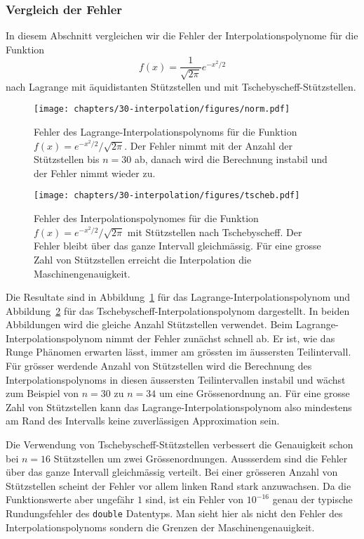%
%
%
\subsubsection{Vergleich der Fehler}
In diesem Abschnitt vergleichen wir die Fehler der Interpolationspolynome
für die Funktion
%
%
\[
f(x)
=
\frac{1}{\sqrt{2\pi}} e^{-x^2/2}
\]
nach Lagrange mit äquidistanten Stützstellen und mit
%
%
Tschebyscheff-Stützstellen.
%

\begin{figure}
\centering
\texttt{[image: chapters/30-interpolation/figures/norm.pdf]}
\caption{Fehler des Lagrange-Interpolationspolynoms für die Funktion
$f(x)=e^{-x^2/2}/\sqrt{2\pi}$.
Der Fehler nimmt mit der Anzahl der Stützstellen bis $n=30$ ab, danach
wird die Berechnung instabil und der Fehler nimmt wieder zu.
%
\label{buch:figure:lagrangefehler}}
\end{figure}


\begin{figure}
\centering
\texttt{[image: chapters/30-interpolation/figures/tscheb.pdf]}
\caption{Fehler des Interpolationspolynomes für die Funktion
$f(x)=e^{-x^2/2}/\sqrt{2\pi}$ mit Stützstellen nach Tschebyscheff.
Der Fehler bleibt über das ganze Intervall gleichmässig.
Für eine grosse Zahl von Stützstellen erreicht die Interpolation die
Maschinengenauigkeit.
\label{buch:figure:tschebyschefffehler}}
\end{figure}

Die Resultate sind in Abbildung~\ref{buch:figure:lagrangefehler}
für das Lagrange-Interpolationspolynom und
Abbildung~\ref{buch:figure:tschebyschefffehler}
für das Tschebyscheff-Interpolationspolynom dargestellt.
In beiden Abbildungen wird die gleiche Anzahl Stützstellen verwendet.
Beim Lagrange-Interpolationspolynom nimmt der Fehler zunächst schnell ab.
Er ist, wie das Runge Phänomen erwarten lässt, immer am grössten im
äussersten Teilintervall.
Für grösser werdende Anzahl von Stützstellen wird die Berechnung des 
Interpolationspolynoms in diesen äussersten Teilintervallen instabil
und wächst zum Beispiel von $n=30$ zu $n=34$ um eine Grössenordnung an.
Für eine grosse Zahl von Stützstellen kann das Lagrange-Interpolationspolynom
also mindestens am Rand des Intervalls keine zuverlässigen Approximation sein.

Die Verwendung von Tschebyscheff-Stützstellen verbessert die Genauigkeit
schon bei $n=16$ Stützstellen um zwei Grössenordnungen.
Aussserdem sind die Fehler über das ganze Intervall gleichmässig
verteilt.
Bei einer grösseren Anzahl von Stützstellen scheint der Fehler 
vor allem linken Rand stark anzuwachsen.
Da die Funktionswerte aber ungefähr $1$ sind, ist
ein Fehler von $10^{-16}$ genau der typische Rundungsfehler des
\texttt{double} Datentyps.
Man sieht hier als nicht den Fehler des Interpolationspolynoms sondern
die Grenzen der Maschinengenauigkeit.






